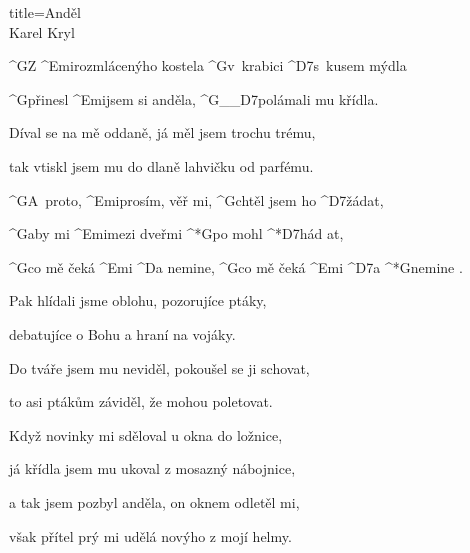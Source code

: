 \begin{song}{title=\predtitle \centering Anděl \\\large Karel Kryl   \vspace*{-0.3cm}}  %
\begin{centerjustified}
\nejnejvetsi
\sloka 
	^{G}Z ^{\z Emi}rozmlácenýho kostela ^{G\z}v~krabici ^{D7\z}s~kusem mýdla

	^{G\z}přinesl ^{Emi}jsem si anděla, ^{G{\color{white}\_\_}D7}polámali mu křídla.

	Díval se na mě oddaně, já měl jsem trochu trému,

	tak vtiskl jsem mu do dlaně lahvičku od parfému.

	^{G\z}A~proto, ^{Emi\z }prosím, věř mi, ^{G\z}chtěl jsem ho ^{D7\z}žádat,
	
	^{G}aby mi ^{Emi\z }mezi dveřmi ^*{G}po mohl ^*{D7}hád at,

	^{G}co mě čeká ^{Emi} ^{D}a nemine, ^{G}co mě čeká ^{Emi} ^{D7}a  ^*{\z G}nemine .

\sloka
	Pak hlídali jsme oblohu, pozorujíce ptáky,
	
	debatujíce o Bohu a hraní na vojáky.

	Do tváře jsem mu neviděl, pokoušel se ji schovat,

	to asi ptákům záviděl, že mohou poletovat.


\sloka
	Když novinky mi sděloval u okna do ložnice,

	já křídla jsem mu ukoval z mosazný nábojnice,
	
	a tak jsem pozbyl anděla, on oknem odletěl mi,

	však přítel prý mi udělá novýho z mojí helmy.


\end{centerjustified}
\setcounter{Slokočet}{0}
\end{song}
